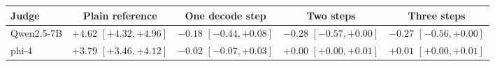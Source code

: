 \begin{tabular}{lcccc}
\toprule
Judge & Plain reference & One decode step & Two steps & Three steps \\
\midrule
Qwen2.5-7B & $+4.62$ {\scriptsize$[+4.32,+4.96]$} & $-0.18$ {\scriptsize$[-0.44,+0.08]$} & $-0.28$ {\scriptsize$[-0.57,+0.00]$} & $-0.27$ {\scriptsize$[-0.56,+0.00]$} \\
phi-4 & $+3.79$ {\scriptsize$[+3.46,+4.12]$} & $-0.02$ {\scriptsize$[-0.07,+0.03]$} & $+0.00$ {\scriptsize$[+0.00,+0.01]$} & $+0.01$ {\scriptsize$[+0.00,+0.01]$} \\
\bottomrule
\end{tabular}
